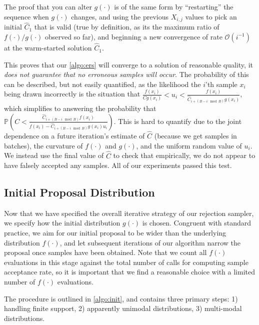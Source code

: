 \documentclass{ecai}  %
\begin{document}
The proof that you can alter $g(\cdot)$ is of the same form by ``restarting'' the sequence when $g(\cdot)$ changes, and using the previous $X_{i,j}$ values to pick an initial $\widehat{C}_1$ that is valid (true by definition, as its the maximum ratio of $f(\cdot)/g(\cdot)$ observed so far), and beginning a new convergence of rate $\mathcal{O}(i^{-1})$ at the warm-started solution $\widehat{C}_1$. 

This proves that our \autoref{algo:ers} will converge to a solution of reasonable quality, it \textit{does not guarantee that no erroneous samples will occur}. The probability of this can be described, but not easily quantified, as the likelihood the $i$'th sample $x_i$ being drawn incorrectly is the situation that $\frac{f(x_i)}{C g(x_i)} < u_i < \frac{f(x_i)}{ \widehat{C}_{i + (B-i \mod B)} g(x_i)}$, which simplifies to answering the probability that $\mathbb{P}\left(C < \frac{ \widehat{C}_{i + (B-i \mod B)} f(x_i)}{f(x_i) -  \widehat{C}_{i + (B-i \mod B)} g(x_i) u_i} \right)$. This is hard to quantify due to the joint dependence on a future iteration's estimate of $\hat{C}$ (because we get samples in batches), the curvature of $f(\cdot)$ and $g(\cdot)$, and the uniform random value of $u_i$. We instead use the final value of $\hat{C}$ to check that empirically, we do not appear to have falsely accepted any samples. All of our experiments passed this test. 

\subsection{Initial Proposal Distribution} \label{sec:init}

Now that we have specified the overall iterative strategy of our rejection sampler, we specify how the initial distribution $g(\cdot)$ is chosen. Congruent with standard practice, we aim for our initial proposal to be wider than the underlying distribution $f(\cdot)$, and let subsequent iterations of our algorithm narrow the proposal once samples have been obtained. Note that we count all $f(\cdot)$ evaluations in this stage against the total number of calls for computing sample acceptance rate, so it is important that we find a reasonable choice with a limited number of $f(\cdot)$ evaluations. 



The procedure is outlined in \autoref{algo:init}, and contains three primary steps: 1) handling finite support, 2) apparently unimodal distributions, 3) multi-modal distributions. 
\end{document}

